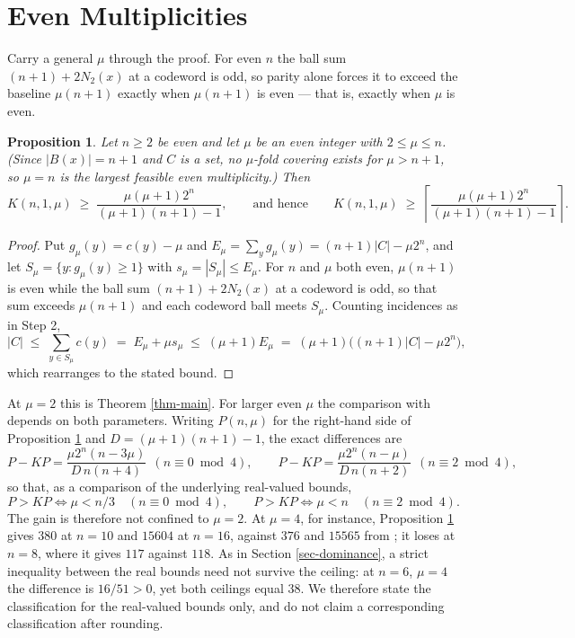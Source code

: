 \documentclass[10pt,a4paper]{article}
\newtheorem{proposition}{Proposition}[section]
\begin{document}
\section{Even Multiplicities}\label{sec-mu}

Carry a general $\mu$ through the proof. For even $n$ the ball sum
$(n+1)+2N_2(x)$ at a codeword is odd, so parity alone forces it to exceed the
baseline $\mu(n+1)$ exactly when $\mu(n+1)$ is even --- that is, exactly when
$\mu$ is even.

\begin{proposition}\label{prop-mu}
Let $n\ge 2$ be even and let $\mu$ be an even integer with $2\le\mu\le n$.
(Since $|B(x)|=n+1$ and $C$ is a set, no $\mu$-fold covering exists for
$\mu>n+1$, so $\mu=n$ is the largest feasible even multiplicity.) Then
\[
  K(n,1,\mu)\;\ge\;\frac{\mu(\mu+1)2^n}{(\mu+1)(n+1)-1},
  \qquad\text{and hence}\qquad
  K(n,1,\mu)\;\ge\;\left\lceil\frac{\mu(\mu+1)2^n}{(\mu+1)(n+1)-1}\right\rceil .
\]
\end{proposition}

\begin{proof}
Put $g_\mu(y)=c(y)-\mu$ and $E_\mu=\sum_y g_\mu(y)=(n+1)|C|-\mu 2^n$, and let
$S_\mu=\{y:g_\mu(y)\ge 1\}$ with $s_\mu=|S_\mu|\le E_\mu$. For $n$ and $\mu$
both even, $\mu(n+1)$ is even while the ball sum $(n+1)+2N_2(x)$ at a codeword
is odd, so that sum exceeds $\mu(n+1)$ and each codeword ball meets $S_\mu$.
Counting incidences as in Step 2,
\[
  |C|\;\le\;\sum_{y\in S_\mu} c(y)\;=\;E_\mu+\mu s_\mu\;\le\;(\mu+1)E_\mu
      \;=\;(\mu+1)\bigl((n+1)|C|-\mu 2^n\bigr),
\]
which rearranges to the stated bound. \qedhere
\end{proof}

At $\mu=2$ this is Theorem \ref{thm-main}. For larger even $\mu$ the comparison
with \cite{KP-2021} depends on both parameters. Writing $P(n,\mu)$ for the
right-hand side of Proposition \ref{prop-mu} and $D=(\mu+1)(n+1)-1$, the exact
differences are
\[
  P-KP=\frac{\mu 2^n(n-3\mu)}{D\,n(n+4)}\ \ (n\equiv 0\bmod 4),
  \qquad
  P-KP=\frac{\mu 2^n(n-\mu)}{D\,n(n+2)}\ \ (n\equiv 2\bmod 4),
\]
so that, as a comparison of the underlying real-valued bounds,
\[
  P>KP \iff \mu<n/3 \quad (n\equiv 0\bmod 4),
  \qquad
  P>KP \iff \mu<n \quad (n\equiv 2\bmod 4).
\]
The gain is therefore not confined to $\mu=2$. At $\mu=4$, for instance,
Proposition \ref{prop-mu} gives $380$ at $n=10$ and $15604$ at $n=16$, against
$376$ and $15565$ from \cite{KP-2021}; it loses at $n=8$, where it gives $117$
against $118$. As in Section \ref{sec-dominance}, a strict inequality between
the real bounds need not survive the ceiling: at $n=6$, $\mu=4$ the difference
is $16/51>0$, yet both ceilings equal $38$. We therefore state the
classification for the real-valued bounds only, and do not claim a
corresponding classification after rounding.
\end{document}
